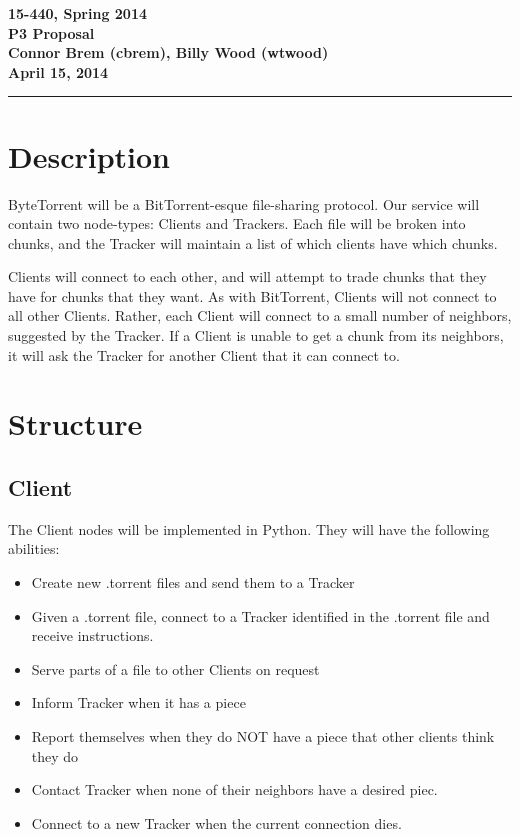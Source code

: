 \documentclass[11pt]{article}
\newcommand{\assignment}{P3 Proposal}
\newcommand{\duedate}{April 15, 2014}
\newcommand{\header}{\noindent \textbf{15-440, Spring 2014 \\ \assignment \\ 
                     Connor Brem (cbrem), Billy Wood (wtwood) \\ \duedate} 
                     \vspace{0.10in} \hrule}
\begin{document}
\header

\section*{Description}

ByteTorrent will be a BitTorrent-esque file-sharing protocol. 
Our service will contain two node-types: Clients and Trackers.
Each file will be broken into chunks, and the Tracker will maintain a list of
which clients have which chunks.

Clients will connect to each other, and will attempt to trade chunks that they
have for chunks that they want.
As with BitTorrent, Clients will not connect to all other Clients.
Rather, each Client will connect to a small number of neighbors,
suggested by the Tracker.
If a Client is unable to get a chunk from its neighbors,
it will ask the Tracker for another Client that it can connect to.

\section*{Structure}

\subsection*{Client}
The Client nodes will be implemented in Python.
They will have the following abilities:
\begin{itemize}
\item  Create new .torrent files and send them to a Tracker
\item  Given a .torrent file, connect to a Tracker identified in the
       .torrent file and receive instructions.
\item  Serve parts of a file to other Clients on request
\item  Inform Tracker when it has a piece
\item  Report themselves when they do NOT have a piece that other clients
       think they do
\item  Contact Tracker when none of their neighbors have a desired piec.
\item  Connect to a new Tracker when the current connection dies.
\end{itemize}
\end{document}

